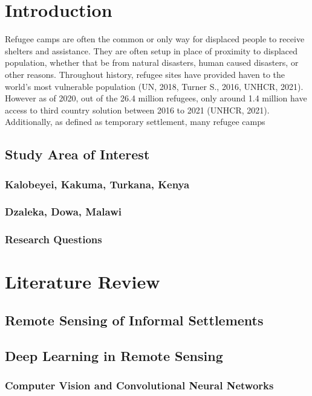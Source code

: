 \documentclass[11pt, a4paper, twoside]{report}
\begin{document}
\newpage

\chapter{Introduction}\label{Intro}

Refugee camps are often the common or only way for displaced people to receive shelters and assistance. They are often setup in place of proximity to displaced population, whether that be from natural disasters, human caused disasters, or other reasons. Throughout history, refugee sites have provided haven to the world's most vulnerable population (UN, 2018, Turner S., 2016, UNHCR, 2021). However as of 2020, out of the 26.4 million refugees, only around 1.4 million have access to third country solution between 2016 to 2021 (UNHCR, 2021). Additionally, as defined as temporary settlement, many refugee camps

\section{Study Area of Interest}\label{StudyAOI}
\subsection{Kalobeyei, Kakuma, Turkana, Kenya}\label{Kalobeyei}
\subsection{Dzaleka, Dowa, Malawi}\label{Dzaleka}
\subsection{Research Questions}\label{RQ}

\newpage

\chapter{Literature Review}\label{LitReview}
\section{Remote Sensing of Informal Settlements}\label{RSofInformalSettlement}
\section{Deep Learning in Remote Sensing}\label{DLinRS}
\subsection{Computer Vision and Convolutional Neural Networks}\label{CVandCNN}
\end{document}
